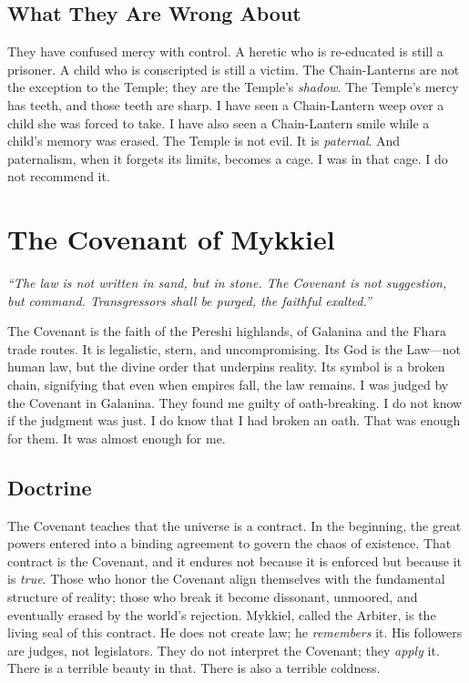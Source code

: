 \documentclass{book}
\begin{document}
\subsection{What They Are Wrong About}

They have confused mercy with control. A heretic who is re-educated is still a prisoner. A child who is conscripted is still a victim. The Chain-Lanterns are not the exception to the Temple; they are the Temple's \textit{shadow}. The Temple's mercy has teeth, and those teeth are sharp. I have seen a Chain-Lantern weep over a child she was forced to take. I have also seen a Chain-Lantern smile while a child's memory was erased. The Temple is not evil. It is \textit{paternal}. And paternalism, when it forgets its limits, becomes a cage. I was in that cage. I do not recommend it.

\section{The Covenant of Mykkiel}

\textit{``The law is not written in sand, but in stone. The Covenant is not suggestion, but command. Transgressors shall be purged, the faithful exalted.''}

The Covenant is the faith of the Pereshi highlands, of Galanina and the Fhara trade routes. It is legalistic, stern, and uncompromising. Its God is the Law---not human law, but the divine order that underpins reality. Its symbol is a broken chain, signifying that even when empires fall, the law remains. I was judged by the Covenant in Galanina. They found me guilty of oath-breaking. I do not know if the judgment was just. I do know that I had broken an oath. That was enough for them. It was almost enough for me.

\subsection{Doctrine}

The Covenant teaches that the universe is a contract. In the beginning, the great powers entered into a binding agreement to govern the chaos of existence. That contract is the Covenant, and it endures not because it is enforced but because it is \textit{true}. Those who honor the Covenant align themselves with the fundamental structure of reality; those who break it become dissonant, unmoored, and eventually erased by the world's rejection. Mykkiel, called the Arbiter, is the living seal of this contract. He does not create law; he \textit{remembers} it. His followers are judges, not legislators. They do not interpret the Covenant; they \textit{apply} it. There is a terrible beauty in that. There is also a terrible coldness.
\end{document}
